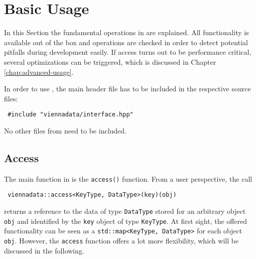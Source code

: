 \chapter{Basic Usage} \label{chap:basic-usage}

In this Section the fundamental operations in {\ViennaData} are explained. 
All functionality is available out of the box and operations are checked in order to detect potential pitfalls during development easily.
 If {\ViennaData} access turns out to be 
performance critical, several optimizations can be triggered, which is discussed in Chapter \ref{chap:advanced-usage}.

In order to use {\ViennaData}, the main header file has to be included in the respective source files:
\begin{lstlisting}
 #include "viennadata/interface.hpp"
\end{lstlisting}
No other files from {\ViennaData} need to be included.

\section{Access} \label{sec:access}
The main function in {\ViennaData} is the \lstinline|access()| function. From a user perspective,
the call
\begin{lstlisting}
 viennadata::access<KeyType, DataType>(key)(obj) 
\end{lstlisting}
returns a reference to the data of type \lstinline|DataType| stored for an arbitrary object \lstinline|obj| and identified by the \lstinline|key| object of
type \lstinline|KeyType|. At first sight, the offered functionality can be seen as a \lstinline|std::map<KeyType, DataType>| for each object \lstinline|obj|.
However, the \lstinline|access| function offers a lot more flexibility, which will be discussed in the following.

